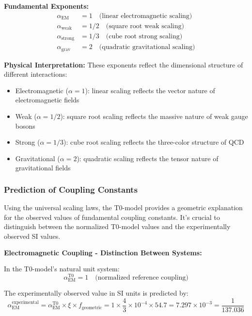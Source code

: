 \documentclass[12pt,a4paper]{article}
\begin{document}
	\textbf{Fundamental Exponents:}
	\begin{align}
		\alpha_{\text{EM}} &= 1 \quad \text{(linear electromagnetic scaling)} \\
		\alpha_{\text{weak}} &= 1/2 \quad \text{(square root weak scaling)} \\
		\alpha_{\text{strong}} &= 1/3 \quad \text{(cube root strong scaling)} \\
		\alpha_{\text{grav}} &= 2 \quad \text{(quadratic gravitational scaling)}
	\end{align}
	
	\textbf{Physical Interpretation:} These exponents reflect the dimensional structure of different interactions:
	\begin{itemize}
		\item Electromagnetic ($\alpha = 1$): linear scaling reflects the vector nature of electromagnetic fields
		\item Weak ($\alpha = 1/2$): square root scaling reflects the massive nature of weak gauge bosons
		\item Strong ($\alpha = 1/3$): cube root scaling reflects the three-color structure of QCD
		\item Gravitational ($\alpha = 2$): quadratic scaling reflects the tensor nature of gravitational fields
	\end{itemize}
	
	\subsubsection{Prediction of Coupling Constants}
	
	Using the universal scaling laws, the T0-model provides a geometric explanation for the observed values of fundamental coupling constants. It's crucial to distinguish between the normalized T0-model values and the experimentally observed SI values.
	
	\textbf{Electromagnetic Coupling - Distinction Between Systems:}
	
	In the T0-model's natural unit system:
	\begin{equation}
		\alpha_{\text{EM}}^{\text{T0}} = 1 \quad \text{(normalized reference coupling)}
	\end{equation}
	
	The experimentally observed value in SI units is predicted by:
	\begin{equation}
		\alpha_{\text{EM}}^{\text{experimental}} = \alpha_{\text{EM}}^{\text{T0}} \times \xi \times f_{\text{geometric}} = 1 \times \frac{4}{3} \times 10^{-4} \times 54.7 = 7.297 \times 10^{-3} = \frac{1}{137.036}
	\end{equation}
	
\end{document}
